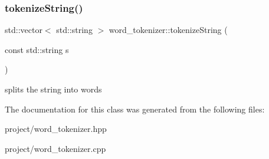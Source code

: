 \subsubsection{\texorpdfstring{tokenize\+String()}{tokenizeString()}}
{\footnotesize\ttfamily std\+::vector$<$ std\+::string $>$ word\+\_\+tokenizer\+::tokenize\+String (\begin{DoxyParamCaption}\item[{const std\+::string}]{s }\end{DoxyParamCaption})\hspace{0.3cm}{\ttfamily [static]}}

splits the string into words 

The documentation for this class was generated from the following files\+:\begin{DoxyCompactItemize}
\item 
project/word\+\_\+tokenizer.\+hpp\item 
project/word\+\_\+tokenizer.\+cpp\end{DoxyCompactItemize}
